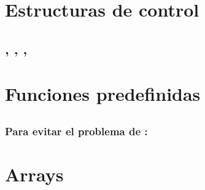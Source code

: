 \documentclass[a4paper,11pt,spanish]{sphinxmanual}
\begin{document}
\section{Estructuras de control}
\label{\detokenize{php:estructuras-de-control}}

\subsection{, , , }
\label{\detokenize{php:require-require-once-include-include-once}}

\section{Funciones predefinidas}
\label{\detokenize{php:funciones-predefinidas}}

\subsection{}
\label{\detokenize{php:isset}}

\subsection{}
\label{\detokenize{php:empty}}

\subsubsection{Para evitar el problema de :}
\label{\detokenize{php:para-evitar-el-problema-de-empty-0-true}}
\begin{sphinxVerbatim}[commandchars=\\\{\}]
 
       
\end{sphinxVerbatim}


\section{Arrays}
\label{\detokenize{php:arrays}}
\end{document}
